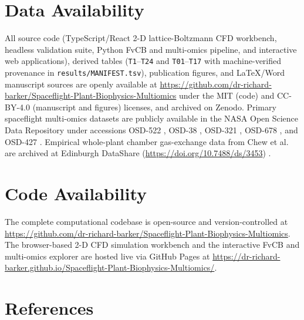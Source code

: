 \documentclass[10pt,twocolumn,a4paper]{article}
\begin{document}
\section*{Data Availability}

All source code (TypeScript/React 2-D lattice-Boltzmann CFD workbench, headless validation suite, Python FvCB and multi-omics pipeline, and interactive web applications), derived tables (\texttt{T1}--\texttt{T24} and \texttt{T01}--\texttt{T17} with machine-verified provenance in \texttt{results/MANIFEST.tsv}), publication figures, and LaTeX/Word manuscript sources are openly available at \url{https://github.com/dr-richard-barker/Spaceflight-Plant-Biophysics-Multiomics} under the MIT (code) and CC-BY-4.0 (manuscript and figures) licenses, and archived on Zenodo. Primary spaceflight multi-omics datasets are publicly available in the NASA Open Science Data Repository \citep{osdr2025} under accessions OSD-522 \citep{osd522}, OSD-38 \citep{osd38}, OSD-321 \citep{osd321}, OSD-678 \citep{osd678}, and OSD-427 \citep{osd427}. Empirical whole-plant chamber gas-exchange data from Chew et al.~\citep{chew2022} are archived at Edinburgh DataShare (\url{https://doi.org/10.7488/ds/3453}) \citep{chew2022data}.

\section*{Code Availability}

The complete computational codebase is open-source and version-controlled at \url{https://github.com/dr-richard-barker/Spaceflight-Plant-Biophysics-Multiomics}. The browser-based 2-D CFD simulation workbench and the interactive FvCB and multi-omics explorer are hosted live via GitHub Pages at \url{https://dr-richard-barker.github.io/Spaceflight-Plant-Biophysics-Multiomics/}.

\section*{References}
\end{document}
